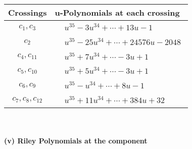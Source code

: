 \documentclass[1p]{elsarticle_modified}
\theoremstyle{definition}
\begin{document}
\begin{tabular}{m{50pt}|m{274pt}}
Crossings & \hspace{64pt}u-Polynomials at each crossing \\
\hline $$\begin{aligned}c_{1},c_{3}\end{aligned}$$&$\begin{aligned}
&u^{35}-3 u^{34}+\cdots+13 u-1
\end{aligned}$\\
\hline $$\begin{aligned}c_{2}\end{aligned}$$&$\begin{aligned}
&u^{35}-25 u^{34}+\cdots+24576 u-2048
\end{aligned}$\\
\hline $$\begin{aligned}c_{4},c_{11}\end{aligned}$$&$\begin{aligned}
&u^{35}+7 u^{34}+\cdots-3 u+1
\end{aligned}$\\
\hline $$\begin{aligned}c_{5},c_{10}\end{aligned}$$&$\begin{aligned}
&u^{35}+5 u^{34}+\cdots-3 u+1
\end{aligned}$\\
\hline $$\begin{aligned}c_{6},c_{9}\end{aligned}$$&$\begin{aligned}
&u^{35}- u^{34}+\cdots+8 u-1
\end{aligned}$\\
\hline $$\begin{aligned}c_{7},c_{8},c_{12}\end{aligned}$$&$\begin{aligned}
&u^{35}+11 u^{34}+\cdots+384 u+32
\end{aligned}$\\
\hline
\end{tabular}\\~\\
\newpage\renewcommand{\arraystretch}{1}
\flushleft \textbf{(v) Riley Polynomials at the component}\newline \\
\end{document}
